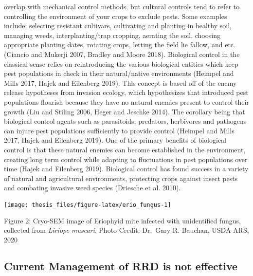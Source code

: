 \documentclass[12pt,final,CPage]{ufthesis}
\begin{document}
{overlap with mechanical control methods, but cultural controls tend to refer to controlling the environment of your crops to exclude pests. Some examples include: selecting resistant cultivars, cultivating and planting in healthy soil, managing weeds, interplanting/trap cropping, aerating the soil, choosing appropriate planting dates, rotating crops, letting the field lie fallow, and etc. (Ciancio and Mukerji 2007, Bradley and Moore 2018). Biological control in the classical sense relies on reintroducing the various biological entities which keep pest populations in check in their natural/native environments (Heimpel and Mills 2017, Hajek and Eilenberg 2019). This concept is based off of the enemy release hypotheses from invasion ecology, which hypothesizes that introduced pest populations flourish because they have no natural enemies present to control their growth (Liu and Stiling 2006, Heger and Jeschke 2014). The corollary being that biological control agents such as parasitoids, predators, herbivores and pathogens can injure pest populations sufficiently to provide control (Heimpel and Mills 2017, Hajek and Eilenberg 2019). One of the primary benefits of biological control is that these natural enemies can become established in the environment, creating long term control while adapting to fluctuations in pest populations over time (Hajek and Eilenberg 2019). Biological control has found success in a variety of natural and agricultural environments, protecting crops against insect pests and combating invasive weed species (Driesche et al. 2010).
  \begin{center}\texttt{[image: thesis\_files/figure-latex/erio\_fungus-1]} \end{center}

  Figure 2: Cryo-SEM image of Eriophyid mite infected with unidentified fungus, collected from \emph{Liriope muscari}. Photo Credit: Dr.~Gary R. Bauchan, USDA-ARS, 2020

  \hypertarget{manage-litrev}{%
  \subsection{Current Management of RRD is not effective}\label{manage-litrev}}

}
\end{document}
